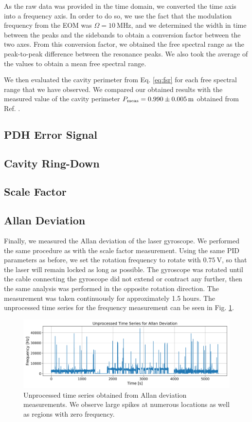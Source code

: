 \documentclass[a4paper]{report}
\numberwithin{equation}{section}
\begin{document}
As the raw data was provided in the time domain, we converted the time axis into a frequency axis.
In order to do so, we use the fact that the modulation frequency from the EOM was $\Omega = \SI{10}{\mega\hertz}$,
and we determined the width in time between the peaks and the sidebands to obtain a conversion factor between 
the two axes. From this conversion factor, we obtained the free spectral range as the peak-to-peak difference between
the resonance peaks. We also took the average of the values to obtain a mean free spectral range.

We then evaluated the cavity perimeter from Eq. \ref{eq:fsr} for each free spectral range that we have observed.
We compared our obtained results with the measured value of the cavity perimeter
 $P_{\text{meas}} = \SI{0.990\pm 0.005}{\meter}$ obtained from Ref. \cite{Groh2021}. 


\subsection{PDH Error Signal}

\subsection{Cavity Ring-Down}

\subsection{Scale Factor} \label{sec:scale_fact}

\subsection{Allan Deviation}

Finally, we measured the Allan deviation of the laser gyroscope. We performed the same procedure as with the scale factor measurement. 
Using the same PID parameters as before, we set the rotation frequency to rotate with $\SI{0.75}{\volt}$, so that the laser will 
remain locked as long as possible. The gyroscope was rotated until the cable connecting the gyroscope did not extend or contract
any further, then the same analysis was performed in the opposite rotation direction. The measurement was taken continuously for 
approximately 1.5 hours. The unprocessed time series for the frequency measurement can be seen in Fig. \ref{fig:allan_ts_raw}. \par 


\begin{figure}[h!]
	\centering
	\includegraphics[width=0.8\columnwidth]{allan_ts_raw.png}
	\caption{Unprocessed time series obtained from Allan deviation measurements. We observe large
			spikes at numerous locations as well as regions with zero frequency.}
	\label{fig:allan_ts_raw}
\end{figure}
\end{document}

